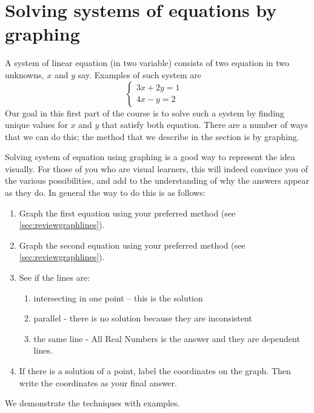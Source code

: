 \section{Solving systems of equations by graphing}
%
A \gls{system} of \gls{linear} equation (in two variable) consists of two equation in two unknowns, $x$ and
$y$ say. Examples of such system are
\begin{equation*}
	\begin{cases}
		3x+2y = 1 &   \\
		4x-y=2    &   
	\end{cases}
\end{equation*}
Our goal in this first part of the course is to \gls{solve} such a system by finding unique values for $x$ and
$y$ that satisfy both equation. There are a number of ways that we can do this; the method that we
describe in the section is by graphing.
																												
Solving system of equation using graphing is a good way to represent the idea visually. For
those of you who are visual learners, this will indeed convince you of the various possibilities, and
add to the understanding of why the answers appear as they do. In general the way to do this is as
follows:
\begin{enumerate}
	\item Graph the first equation using your preferred method (see \cref{sec:reviewgraphlines}).
	\item Graph the second equation using your preferred method (see \cref{sec:reviewgraphlines}).
	\item See if the lines are:
	\begin{enumerate}
		\item intersecting in one point $–$ this is the \gls{solution}
		\item parallel - there is no solution because they are inconsistent
		\item the same line - All Real Numbers is the answer and they are dependent lines.
	\end{enumerate}	 
	\item If there is a solution of a point, label the coordinates on the graph. Then write the
	coordinates as your final answer.
\end{enumerate}
We demonstrate the techniques with examples.
																												
